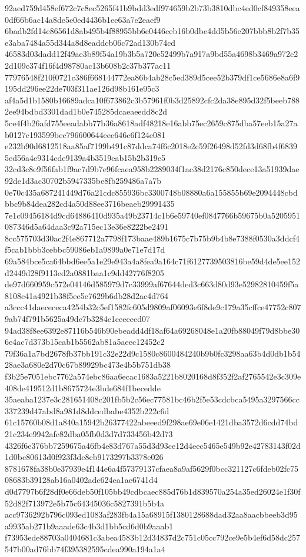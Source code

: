 \documentclass[11pt,a4paper]{article}
\begin{document}
{92aed759d458ef672c7c8ec5265f41b9bdd3edf974659b2b73b3810dbc4ed0cf849358eea0df66b6ac14a8de5e0ed4436b1ee63a7e2eaef9
6badb2fd14e86561d8ab495b4f88955bb6e0446ceb16b0dbe4dd5b56e207bbb8b2f7b35e3aba7484a55d344a8d8eaddcb06c72ad130b74cd
46583d03dadd12f49ae3b89f54a19b3b5a720e52499b7a917a9bd55a4698b3469a972c22d109c374f16f4d98780ac13b608b2c37b377ac11
77976548f210f0721c386f668144772ea86b4ab28c5ed389d5cee52b379df1ce5686e8a6f9195dd296ee22de703f311ae126d98b161e95c3
af4a5d1b1580b16689adca10f673862c3b57961f0b3d25892cfc2da38e895d32f5beeb7882ee94bdbd3301dad1b0e745285dcaeaeedd8c2d
5ce4f4b26afd755eeadabb77b36a8618adf48218e16abb75ec2659c875dba57eeb15a27ab0127c193599bec796600644eee646c6f124e081
e232b90d6812518aa85af7199b491c87ddca74f6c2018e2c59f26498d52fd3d68fb4f68395ed56a4e9314cde9139a4b3519eab15b2b319c5
32cd3c8e9f56fab1f9ac7d9b7e96fcaea958b2289034f1ac38d2176c850dece13a51939dae92de1d3ac30702b5947335be8fb259486a7a7b
0e70c435a687241449d76a21cdc855936bc3300748b08880a6a155855b69e2094448cbdbbc9b84dea282cd4a50d88ee3716beaeb29991435
7e1c09456184d9cd64886410d935a49b23714c1b6e59740ef0847766b59675b0a5205951087346d5a64daa3c92a715ec13e36e8222be2491
8cc575703d30ac2f4e867712a7798f173baae489b1675c7b75b9b4b8e7388f0530a3ddcf4f5cab1bbb3cebbc59086eb1a9899a0e71e7d17d
69a584bce5ca64bbd6ee5a1e29e943a4a8fea9a164c71f6127739503816be59d4de5ee152d2449d28f9113ed2a0881baa1c9dd42776f8205
de97d660959c572e04146d585979d7c33999af67644ded3c663d80d93e52982810459f5a8108c41a4921b38f5ee5e7629b6db28d2ac4d764
a3ccc41daecececa4254b32c5ef1582fc605d9809af06093e6f8de9c179a35cffce47752c8079ab74f791b5625a49dc7b3284c1ceececd07
94ad38f8ee6392e87116b546b90ebeadd4df18af64a69268048e1a20fb88049f79d8bbe306e4ac7d373b15cab1b5562ab81a5aeec12452c2
79f36a1a7bd2678fb37bb191c32e22d9c1580c8600484240b9b0fc3298aa63b4d0db1b5428ae3a680e2d70c67b89929bc473e4b5b751db38
f3b25e7051ebc7762a574ebc86aa6ecac1683a5221b8020168d8f352f2af2765542e3c309e408de419512d1b8675724e3bde684f1becedde
35aeaba1237e3c281651408c201fb5b2c56ec77581bc46b2f5e53cdcbca5495a3297566cc337239d47abd8a981d8ddcedbabe4352b222c6d
61c15760b08d1a840a15942b26377422abeeed9f298ae69e06e1421dba3572d6cdd74bd21c234e9942afc82dba05fb0d3d7d733456b42d73
4326f6e376bb7259675a46fb4e83d767a55d3d93ce12d4eec5465e549b92e42783143f02d1d0bc80613d0f923f3dc8cb9173297b3378e026
8781678fa38b0e37939e4f144e6a4f57379137cfaea8a9af5629f0bcc321127c6fdeb02fc7508683b39128ab16a0402adc624ea1ae6741d4
d0d7797b6f28df0e66deb50f105bb49cdbcaec885d76b1d839570a254a35ed26024e1f30f52d82f713972e5b75c64345036c5827391b5b4a
acc9736292b796c093ed1083af283fb4a15a68915f1380128688dad32aa8aacbbeeb3d95a9935ab271b9aaade63c4b3d1bb5cd6d0b9aaab1
f73953ede88703a0404681c3abea4583b12d34837d2c751c05cc792ce9e5b4ef6d58dc257547b00ad76bb74f395382595cdea990a194a1a4
}
\end{document}
